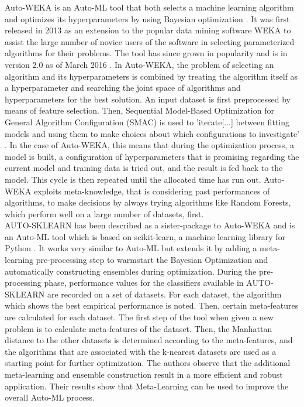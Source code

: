 \documentclass[12pt]{scrartcl}
\begin{document}
Auto-WEKA is an Auto-ML tool that both selects a machine learning algorithm and optimizes its hyperparameters by using Bayesian optimization \cite{thornton2013auto}. It was first released in 2013 as an extension to the popular data mining software WEKA \cite{hall2009weka} to assist the large number of novice users of the software in selecting parameterized algorithms for their problems. The tool has since grown in popularity and is in version 2.0 as of March 2016 \cite{kotthoff2016auto}. In Auto-WEKA, the problem of selecting an algorithm and its hyperparameters is combined by treating the algorithm itself as a hyperparameter and searching the joint space of algorithms and hyperparameters for the best solution. An input dataset is first preprocessed by means of feature selection. Then, Sequential Model-Based Optimization for General Algorithm Configuration (SMAC) is used to 'iterate[...] between fitting models and using them to make choices about which configurations to investigate' \cite{hutter2011sequential}. In the case of Auto-WEKA, this means that during the optimization process, a model is built, a configuration of hyperparameters that is promising regarding the current model and training data is tried out, and the result is fed back to the model. This cycle is then repeated until the allocated time has run out. Auto-WEKA exploits meta-knowledge, that is considering past performances of algorithms, to make decisions by always trying algorithms like Random Forests, which perform well on a large number of datasets, first. \\

AUTO-SKLEARN has been described as a sister-package to Auto-WEKA and is an Auto-ML tool which is based on scikit-learn, a machine learning library for Python \cite{feurer2015efficient}. It works very similar to Auto-ML but extends it by adding a meta-learning pre-processing step to warmstart the Bayesian Optimization and automatically constructing ensembles during optimization. During the pre-processing phase, performance values for the classifiers available in AUTO-SKLEARN are recorded on a set of datasets. For each dataset, the algorithm which shows the best empirical performance is noted. Then, certain meta-features are calculated for each dataset. The first step of the tool when given a new problem is to calculate meta-features of the dataset. Then, the Manhattan distance to the other datasets is determined according to the meta-features, and the algorithms that are associated with the k-nearest datasets are used as a starting point for further optimization. The authors observe that the additional meta-learning and ensemble construction result in a more efficient and robust application. Their results show that Meta-Learning can be used to improve the overall Auto-ML process.\\
\end{document}
